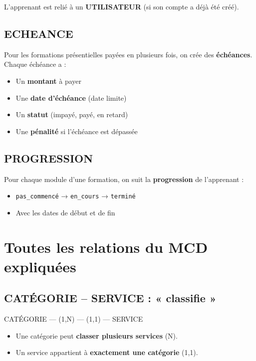 \documentclass[12pt,a4paper]{article}
\begin{document}
L'apprenant est relié à un \textbf{UTILISATEUR} (si son compte a déjà été créé).

\subsection{ECHEANCE}

Pour les formations présentielles payées en plusieurs fois, on crée des \textbf{échéances}. Chaque échéance a :
\begin{itemize}
    \item Un \textbf{montant} à payer
    \item Une \textbf{date d'échéance} (date limite)
    \item Un \textbf{statut} (impayé, payé, en retard)
    \item Une \textbf{pénalité} si l'échéance est dépassée
\end{itemize}

\subsection{PROGRESSION}

Pour chaque module d'une formation, on suit la \textbf{progression} de l'apprenant :
\begin{itemize}
    \item \texttt{pas\_commencé} → \texttt{en\_cours} → \texttt{terminé}
    \item Avec les dates de début et de fin
\end{itemize}

\section{Toutes les relations du MCD expliquées}

\subsection{CATÉGORIE -- SERVICE : « classifie »}


CATÉGORIE --- (1,N) --- (1,1) --- SERVICE


\begin{itemize}
    \item Une catégorie peut \textbf{classer plusieurs services} (N).
    \item Un service appartient à \textbf{exactement une catégorie} (1,1).
\end{itemize}
\end{document}
